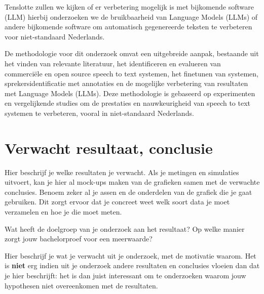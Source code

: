 \par Tenslotte zullen we kijken of er verbetering mogelijk is met bijkomende software (LLM) hierbij onderzoeken we de bruikbaarheid van Language Models (LLMs) of andere bijkomende software om automatisch gegenereerde teksten te verbeteren voor niet-standaard Nederlands.


\par De methodologie voor dit onderzoek omvat een uitgebreide aanpak, bestaande uit het vinden van relevante literatuur, het identificeren en evalueren van commerciële en open source speech to text systemen, het finetunen van systemen, sprekersidentificatie met annotaties en de mogelijke verbetering van resultaten met Language Models (LLMs). Deze methodologie is gebaseerd op experimenten en vergelijkende studies om de prestaties en nauwkeurigheid van speech to text systemen te verbeteren, vooral in niet-standaard Nederlands.

\section{Verwacht resultaat, conclusie}%
\label{sec:verwachte_resultaten}

Hier beschrijf je welke resultaten je verwacht. Als je metingen en simulaties uitvoert, kan je hier al mock-ups maken van de grafieken samen met de verwachte conclusies. Benoem zeker al je assen en de onderdelen van de grafiek die je gaat gebruiken. Dit zorgt ervoor dat je concreet weet welk soort data je moet verzamelen en hoe je die moet meten.

Wat heeft de doelgroep van je onderzoek aan het resultaat? Op welke manier zorgt jouw bachelorproef voor een meerwaarde?

Hier beschrijf je wat je verwacht uit je onderzoek, met de motivatie waarom. Het is \textbf{niet} erg indien uit je onderzoek andere resultaten en conclusies vloeien dan dat je hier beschrijft: het is dan juist interessant om te onderzoeken waarom jouw hypothesen niet overeenkomen met de resultaten.


